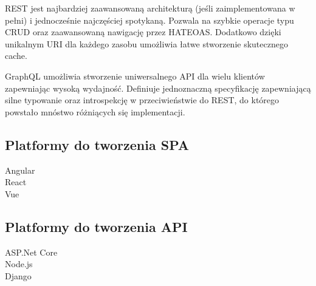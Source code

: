 		REST jest najbardziej zaawansowaną architekturą (jeśli zaimplementowana w pełni) i jednocześnie najczęściej spotykaną.
		Pozwala na szybkie operacje typu CRUD oraz zaawansowaną nawigację przez HATEOAS.
		Dodatkowo dzięki unikalnym URI dla każdego zasobu umożliwia łatwe stworzenie skutecznego cache.

		GraphQL umożliwia stworzenie uniwersalnego API dla wielu klientów zapewniając wysoką wydajność.
		Definiuje jednoznaczną specyfikację zapewniającą silne typowanie oraz introspekcję w przeciwieństwie do REST,
		do którego powstało mnóstwo różniących się implementacji.

	\subsection{Platformy do tworzenia SPA}
		\begin{description}
			\item[Angular] 
			\item[React] 
			\item[Vue] 
		\end{description}

	\subsection{Platformy do tworzenia API}
		\begin{description}
			\item[ASP.Net Core]
			\item[Node.js] 
			\item[Django] 
		\end{description}